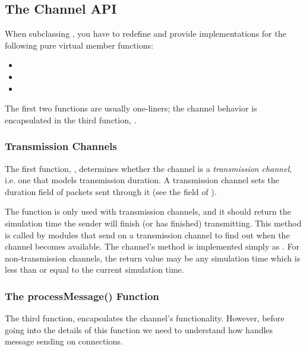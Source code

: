 \subsection{The Channel API}

When subclassing , you have to redefine and provide
implementations for the following pure virtual member functions:

\begin{itemize}
  \item {}
  \item {}
  \item {}
\end{itemize}

The first two functions are usually one-liners; the channel behavior is
encapsulated in the third function, .

\subsubsection{Transmission Channels}

The first function, , determines whether
the channel is a \textit{transmission channel}, i.e. one that models
transmission duration. A transmission channel sets the duration field of
packets sent through it (see the  field of
).

The  function is only used with
transmission channels, and it should return the simulation time the sender
will finish (or has finished) transmitting. This method is called by
modules that send on a transmission channel to find out when the channel
becomes available. The channel's  method is implemented
simply as . For
non-transmission channels, the  return
value may be any simulation time which is less than or equal to the current
simulation time.

\subsubsection{The processMessage() Function}

The third function,  encapsulates the channel's
functionality. However, before going into the details of this function
we need to understand how {\opp} handles message sending on connections.

